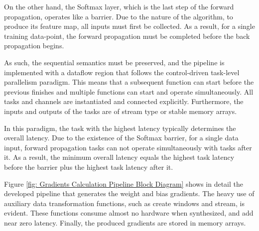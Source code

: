 On the other hand, the Softmax layer, which is the last step of the forward propagation, operates like a barrier. Due to the nature of the algorithm, to produce its feature map, all inputs must first be collected. As a result, for a single training data-point, the forward propagation must be completed before the back propagation begins. %

As such, the sequential semantics must be preserved, and the pipeline is implemented with a dataflow region that follows the control-driven task-level parallelism paradigm. This means that a subsequent function can start before the previous finishes and multiple functions can start and operate simultaneously. All tasks and channels are instantiated and connected explicitly. Furthermore, the inputs and outputs of the tasks are of stream type or stable memory arrays. %

In this paradigm, the task with the highest latency typically determines the overall latency. Due to the existence of the Softmax barrier, for a single data input, forward propagation tasks can not operate simultaneously with tasks after it. As a result, the minimum overall latency equals the highest task latency before the barrier plus the highest task latency after it. %

Figure \ref{fig: Gradients Calculation Pipeline Block Diagram} shows in detail the developed pipeline that generates the weight and bias gradients. The heavy use of auxiliary data transformation functions, such as create windows and stream, is evident. These functions consume almost no hardware when synthesized, and add near zero latency. Finally, the produced gradients are stored in memory arrays. %

